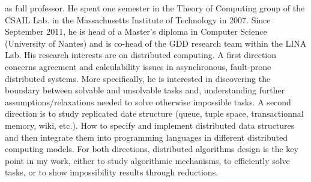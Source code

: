 as full professor. He spent one semester in the Theory of Computing group of the
CSAIL Lab. in the Massachusetts Institute of Technology in 2007. Since September
2011, he is head of a Master's diploma in Computer Science (University of
Nantes) and is co-head of the GDD research team within the LINA Lab.  His
research interests are on distributed computing. A first direction concerns
agreement and calculability issues in asynchronous, fault-prone distributed
systems. More specifically, he is interested in discovering the boundary between
solvable and unsolvable tasks and, understanding further assumptions/relaxations
needed to solve otherwise impossible tasks. A second direction is to study
replicated date structure (queue, tuple space, transactionnal memory, wiki,
etc.). How to specify and implement distributed data structures and then
integrate them into programming languages in different distributed computing
models. For both directions, distributed algorithms design is the key point in
my work, either to study algorithmic mechanisms, to efficiently solve tasks, or
to show impossibility results through reductions.

